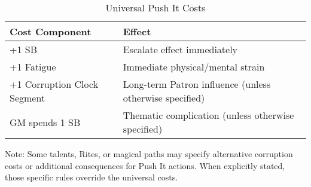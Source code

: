 \begin{table}[h]
\centering
\caption{Universal Push It Costs}
\begin{tabular}{|l|l|}
\hline
\textbf{Cost Component} & \textbf{Effect} \\ 
\hline
+1 SB & Escalate effect immediately \\ 
+1 Fatigue & Immediate physical/mental strain \\ 
+1 Corruption Clock Segment & Long-term Patron influence (unless otherwise specified) \\ 
GM spends 1 SB & Thematic complication (unless otherwise specified) \\ 
\hline
\end{tabular}
\end{table}

Note: Some talents, Rites, or magical paths may specify alternative corruption costs or additional consequences for Push It actions. When explicitly stated, those specific rules override the universal costs.

\newcommand{\PatronGift}[2]{%
\paragraph{Patron's Gift (Imbuement).}
\textbf{Cost: Free, requires a Thaisos}

Once per scene as an action (cost: 1 Boon; requires \textbf{Thiasos}), touch an item to imbue it until scene end with \textbf{+1 Melee} and \textbf{+1 #1}. \emph{Push It:} extend one more scene by marking \textbf{+1 Obligation}. Gifts from the same Patron don’t stack; take the best. Dice bonuses respect the +3 cap. \textit{Domain:} #2.
}

